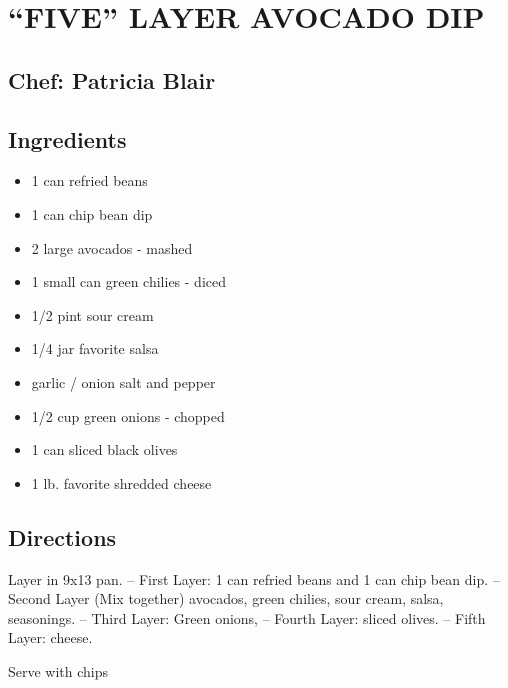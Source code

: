 \documentclass[
]{book}
\providecommand{\tightlist}{%
  \setlength{\itemsep}{0pt}\setlength{\parskip}{0pt}}
\begin{document}
\hypertarget{five-layer-avocado-dip}{%
\section*{``FIVE'' LAYER AVOCADO DIP}\label{five-layer-avocado-dip}}

\hypertarget{chef-patricia-blair-2}{%
\subsection*{Chef: Patricia Blair}\label{chef-patricia-blair-2}}

\hypertarget{ingredients-5}{%
\subsection*{Ingredients}\label{ingredients-5}}

\begin{itemize}
\tightlist
\item
  1 can refried beans
\item
  1 can chip bean dip
\item
  2 large avocados - mashed
\item
  1 small can green chilies - diced
\item
  1/2 pint sour cream
\item
  1/4 jar favorite salsa
\item
  garlic / onion salt and pepper
\item
  1/2 cup green onions - chopped
\item
  1 can sliced black olives
\item
  1 lb. favorite shredded cheese
\end{itemize}

\hypertarget{directions-5}{%
\subsection*{Directions}\label{directions-5}}

Layer in 9x13 pan.
-- First Layer: 1 can refried beans and 1 can chip bean dip.
-- Second Layer (Mix together) avocados, green chilies, sour cream, salsa, seasonings.
-- Third Layer: Green onions,
-- Fourth Layer: sliced olives.
-- Fifth Layer: cheese.

Serve with chips
\end{document}
